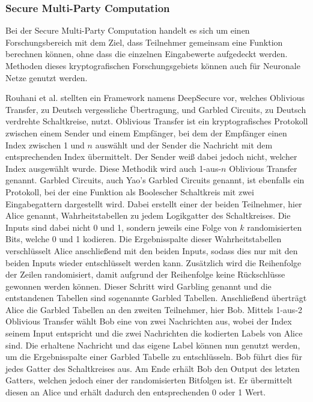 \subsubsection*{Secure Multi-Party Computation}

Bei der Secure Multi-Party Computation handelt es sich um einen Forschungsbereich mit dem Ziel, dass Teilnehmer gemeinsam eine Funktion berechnen können, ohne dass die einzelnen Eingabewerte aufgedeckt werden. 
Methoden dieses kryptografischen Forschungsgebiets können auch für Neuronale Netze genutzt werden.

Rouhani et al. \cite{P-71} stellten ein Framework namens DeepSecure vor, welches Oblivious Transfer, zu Deutsch vergessliche Übertragung, und Garbled Circuits, zu Deutsch verdrehte Schaltkreise, nutzt.
Oblivious Transfer ist ein kryptografisches Protokoll zwischen einem Sender und einem Empfänger, bei dem der Empfänger einen Index zwischen 1 und $n$ auswählt und der Sender die Nachricht mit dem entsprechenden Index übermittelt. 
Der Sender weiß dabei jedoch nicht, welcher Index ausgewählt wurde.
Diese Methodik wird auch 1-aus-$n$ Oblivious Transfer genannt.
Garbled Circuits, auch Yao's Garbled Circuits genannt, ist ebenfalls ein Protokoll, bei der eine Funktion als Boolescher Schaltkreis mit zwei Eingabegattern dargestellt wird.
Dabei erstellt einer der beiden Teilnehmer, hier Alice genannt, Wahrheitstabellen zu jedem Logikgatter des Schaltkreises. 
Die Inputs sind dabei nicht 0 und 1, sondern jeweils eine Folge von $k$ randomisierten Bits, welche 0 und 1 kodieren.
Die Ergebnisspalte dieser Wahrheitstabellen verschlüsselt Alice anschließend mit den beiden Inputs, sodass dies nur mit den beiden Inputs wieder entschlüsselt werden kann. 
Zusätzlich wird die Reihenfolge der Zeilen randomisiert, damit aufgrund der Reihenfolge keine Rückschlüsse gewonnen werden können. 
Dieser Schritt wird Garbling genannt und die entstandenen Tabellen sind sogenannte Garbled Tabellen.
Anschließend überträgt Alice die Garbled Tabellen an den zweiten Teilnehmer, hier Bob.
Mittels 1-aus-2 Oblivious Transfer wählt Bob eine von zwei Nachrichten aus, wobei der Index seinem Input entspricht und die zwei Nachrichten die kodierten Labels von Alice sind.
Die erhaltene Nachricht und das eigene Label können nun genutzt werden, um die Ergebnisspalte einer Garbled Tabelle zu entschlüsseln.
Bob führt dies für jedes Gatter des Schaltkreises aus.
Am Ende erhält Bob den Output des letzten Gatters, welchen jedoch einer der randomisierten Bitfolgen ist. 
Er übermittelt diesen an Alice und erhält dadurch den entsprechenden 0 oder 1 Wert.
